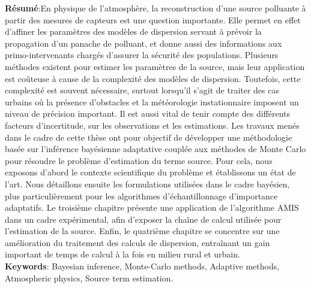 {\small \textbf{Résumé}:En physique de l’atmosphère, la reconstruction d’une source polluante à partir des mesures de capteurs est une question importante. Elle permet en effet d’affiner les paramètres des modèles de dispersion servant à prévoir la propagation d’un panache de polluant, et donne aussi des informations aux primo-intervenants chargés d’assurer la sécurité des populations.
Plusieurs méthodes existent pour estimer les paramètres de la source, mais leur application est coûteuse à cause de la complexité des modèles de dispersion. Toutefois, cette complexité est souvent nécessaire, surtout lorsqu’il s’agit de traiter des cas urbains où la présence d’obstacles et la météorologie instationnaire imposent un niveau de précision important. Il est aussi vital de tenir compte des différents facteurs d’incertitude, sur les observations et les estimations.
Les travaux menés dans le cadre de cette thèse ont pour objectif de développer une méthodologie basée sur l’inférence bayésienne adaptative couplée aux méthodes de Monte Carlo pour résoudre le problème d’estimation du terme source. Pour cela, nous exposons d’abord le contexte scientifique du problème et établissons un état de l’art. Nous détaillons ensuite les formulations utilisées dans le cadre bayésien, plus particulièrement pour les algorithmes d’échantillonnage d’importance adaptatifs. Le troisième chapitre présente une application de l’algorithme AMIS dans un cadre expérimental, afin d’exposer la chaîne de calcul utilisée pour l’estimation de la source. Enfin, le quatrième chapitre se concentre sur une amélioration du traitement des calculs de dispersion, entraînant un gain important de temps de calcul à la fois en milieu rural et urbain.\\

\textbf{Keywords}: Bayesian inference, Monte-Carlo methods, Adaptive methods, Atmospheric physics, Source term estimation.
}


\pagebreak